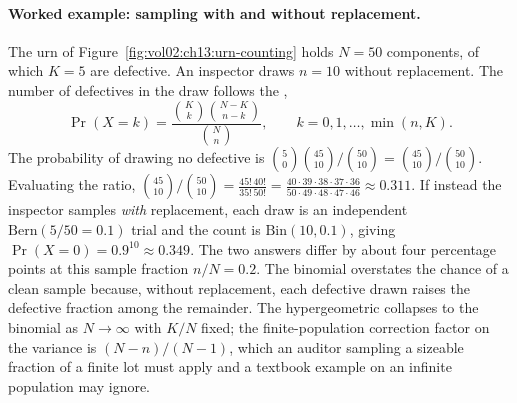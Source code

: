 \paragraph{Worked example: sampling with and without replacement.}
The urn of Figure~\ref{fig:vol02:ch13:urn-counting} holds $N = 50$
components, of which $K = 5$ are defective. An inspector draws
$n = 10$ without replacement. The number of defectives in the draw
follows the ,
\[
\Pr(X = k) = \frac{\binom{K}{k}\binom{N - K}{n - k}}
{\binom{N}{n}},
\qquad k = 0, 1, \ldots, \min(n, K).
\]
The probability of drawing no defective is
$\binom{5}{0}\binom{45}{10}/\binom{50}{10} =
\binom{45}{10}/\binom{50}{10}$. Evaluating the ratio,
$\binom{45}{10}/\binom{50}{10} = \frac{45!\,40!}{35!\,50!} =
\frac{40 \cdot 39 \cdot 38 \cdot 37 \cdot 36}
{50 \cdot 49 \cdot 48 \cdot 47 \cdot 46} \approx 0.311$. If instead
the inspector samples \emph{with} replacement, each draw is an
independent $\mathrm{Bern}(5/50 = 0.1)$ trial and the count is
$\mathrm{Bin}(10, 0.1)$, giving $\Pr(X = 0) = 0.9^{10} \approx
0.349$. The two answers differ by about four percentage points at
this sample fraction $n/N = 0.2$. The binomial overstates the
chance of a clean sample because, without replacement, each
defective drawn raises the defective fraction among the remainder.
The hypergeometric collapses to the binomial as $N \to \infty$ with
$K/N$ fixed; the finite-population correction factor on the variance
is $(N - n)/(N - 1)$, which an auditor sampling a sizeable fraction
of a finite lot must apply and a textbook example on an infinite
population may ignore.

